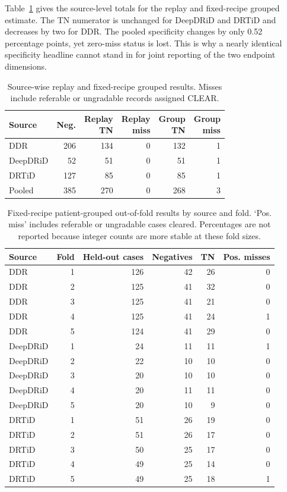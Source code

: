 \documentclass{ieeeaccess}
\begin{document}
Table~\ref{tab:sourcegrouped} gives the source-level totals for the replay and fixed-recipe grouped estimate. The TN numerator is unchanged for DeepDRiD and DRTiD and decreases by two for DDR. The pooled specificity changes by only 0.52 percentage points, yet zero-miss status is lost. This is why a nearly identical specificity headline cannot stand in for joint reporting of the two endpoint dimensions.

\begin{table}[t]
\centering
\caption{Source-wise replay and fixed-recipe grouped results. Misses include referable or ungradable records assigned CLEAR.}
\label{tab:sourcegrouped}
\footnotesize
\setlength{\tabcolsep}{2pt}
\begin{tabular}{lrrrrr}
\toprule
Source & Neg. & \shortstack{Replay\\TN} & \shortstack{Replay\\miss} & \shortstack{Group\\TN} & \shortstack{Group\\miss} \\
\midrule
DDR & 206 & 134 & 0 & 132 & 1 \\
DeepDRiD & 52 & 51 & 0 & 51 & 1 \\
DRTiD & 127 & 85 & 0 & 85 & 1 \\
Pooled & 385 & 270 & 0 & 268 & 3 \\
\bottomrule
\end{tabular}
\end{table}

\begin{table}[t]
\centering
\caption{Fixed-recipe patient-grouped out-of-fold results by source and fold. `Pos. miss' includes referable or ungradable cases cleared. Percentages are not reported because integer counts are more stable at these fold sizes.}
\label{tab:fixedfold}
\begin{tabular}{lrrrrr}
\toprule
Source & Fold & Held-out cases & Negatives & TN & Pos. misses \\
\midrule
DDR & 1 & 126 & 42 & 26 & 0 \\
DDR & 2 & 125 & 41 & 32 & 0 \\
DDR & 3 & 125 & 41 & 21 & 0 \\
DDR & 4 & 125 & 41 & 24 & 1 \\
DDR & 5 & 124 & 41 & 29 & 0 \\
DeepDRiD & 1 & 24 & 11 & 11 & 1 \\
DeepDRiD & 2 & 22 & 10 & 10 & 0 \\
DeepDRiD & 3 & 20 & 10 & 10 & 0 \\
DeepDRiD & 4 & 20 & 11 & 11 & 0 \\
DeepDRiD & 5 & 20 & 10 & 9 & 0 \\
DRTiD & 1 & 51 & 26 & 19 & 0 \\
DRTiD & 2 & 51 & 26 & 17 & 0 \\
DRTiD & 3 & 50 & 25 & 17 & 0 \\
DRTiD & 4 & 49 & 25 & 14 & 0 \\
DRTiD & 5 & 49 & 25 & 18 & 1 \\
\bottomrule
\end{tabular}
\end{table}
\end{document}
